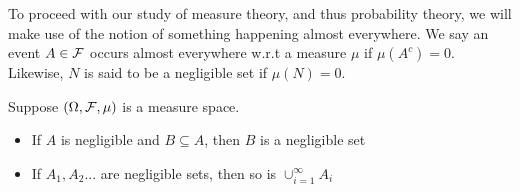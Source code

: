 To proceed with our study of measure theory, and thus probability theory, we will make use of the notion 
of something happening almost everywhere. We say an event $A \in \mathcal F$ occurs almost everywhere w.r.t a measure 
$\mu$ if $\mu(A^c) = 0$. Likewise, $N$ is said to be a negligible set if $\mu(N) = 0$. 

\begin{Proposition}
    Suppose $(\Omega, \mathcal F, \mu)$ is a measure space. 
    \begin{itemize}
        \item If $A$ is negligible and $B \subseteq A$, then $B$ is a negligible set 
        \item If $A_1,A_2...$ are negligible sets, then so is $\cup_{i=1}^\infty A_i$
    \end{itemize}
\end{Proposition}



